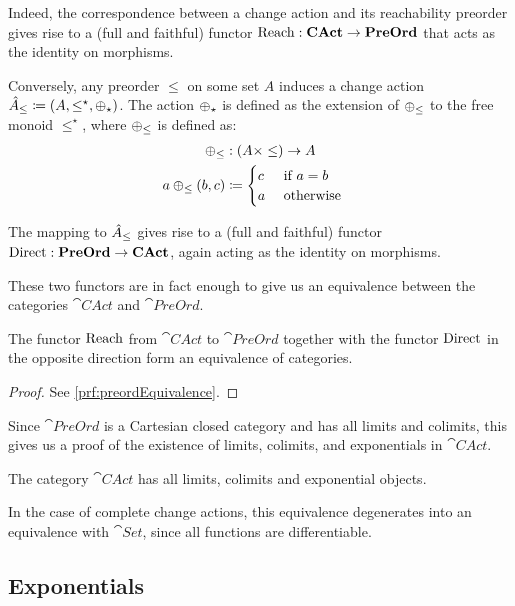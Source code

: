 Indeed, the correspondence between a change action and its reachability preorder gives rise to
a (full and faithful) functor $\operatorname{Reach} : \mathbf{CAct} \rightarrow \mathbf{PreOrd}$ that acts as the
identity on morphisms.

Conversely, any preorder $\leq$ on some set $A$ induces a change action
$\hat{A}_\leq \coloneqq (A,\leq^\star,\oplus_\star)$.
The action $\oplus_\star$ is defined as the extension of $\oplus_\leq$ to the free
monoid $\leq^\star$, where $\oplus_\leq$ is defined as:
\[
\begin{aligned}
   \oplus_\leq &: (A \times \leq) \rightarrow A&\\
   a \oplus_\leq (b, c) &\coloneqq
     \begin{cases}
     c&\text{ if $a = b$}\\
     a&\text{ otherwise}
     \end{cases}
\end{aligned}
\]

The mapping to $\hat{A}_\leq$ gives rise to a (full and faithful) functor
$\operatorname{Direct} : \mathbf{PreOrd} \rightarrow \mathbf{CAct}$, again acting as the identity on morphisms.

These two functors are in fact enough to give us an equivalence between the categories
$\cat{CAct}$ and $\cat{PreOrd}$.

\begin{thm}[name=Equivalence of $\cat{CAct}$ and $\cat{PreOrd}$, restate=preordEquivalence]
  \label{thm:preordEquivalence}
  The functor $\operatorname{Reach}$ from $\cat{CAct}$ to $\cat{PreOrd}$ together with the
  functor $\operatorname{Direct}$ in the opposite direction form an equivalence of categories.
\end{thm}
\ifproofs
\begin{proof}
  See \cref{prf:preordEquivalence}.
\end{proof}
\fi

Since $\cat{PreOrd}$ is a Cartesian closed category and has all limits and
colimits, this gives us a proof of the existence of limits, colimits, and exponentials in $\cat{CAct}$.

\begin{corollary}
  The category $\cat{CAct}$ has all limits, colimits and exponential objects.
\end{corollary}

In the case of complete change actions, this equivalence degenerates into an
equivalence with $\cat{Set}$, since all functions are differentiable.

\subsection{Exponentials}
\label{sec:exponentials}

